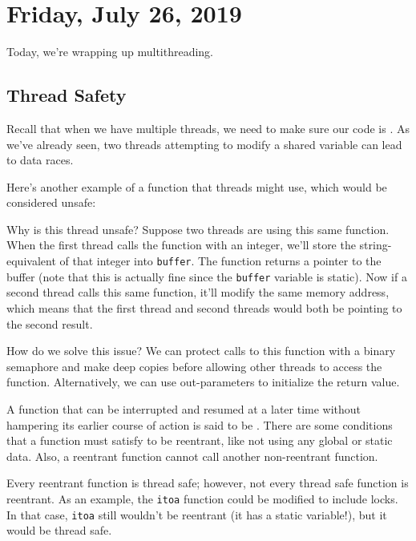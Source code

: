 \section{Friday, July 26, 2019}
Today, we're wrapping up multithreading.

\subsection{Thread Safety}
Recall that when we have multiple threads, we need to make sure our code is . As we've already seen, two threads attempting to modify a shared variable can lead to data races. 

Here's another example of a function that threads might use, which would be considered unsafe:

\lstset{
caption=Thread Unsafe Function
}
\begin{center}

\end{center}

Why is this thread unsafe? Suppose two threads are using this same function. When the first thread calls the function with an integer, we'll store the string-equivalent of that integer into \verb!buffer!. The function returns a pointer to the buffer (note that this is actually fine since the \verb!buffer! variable is static). Now if a second thread calls this same function, it'll modify the same memory address, which means that the first thread and second threads would both be pointing to the second result. 

How do we solve this issue? We can protect calls to this function with a binary semaphore and make deep copies before allowing other threads to access the function. Alternatively, we can use out-parameters to initialize the return value. 


A function that can be interrupted and resumed at a later time without hampering its earlier course of action is said to be . There are some conditions that a function must satisfy to be reentrant, like not using any global or static data. Also, a reentrant function cannot call another non-reentrant function.


Every reentrant function is thread safe; however, not every thread safe function is reentrant. As an example, the \verb!itoa! function could be modified to include locks. In that case, \verb!itoa! still wouldn't be reentrant (it has a static variable!), but it would be thread safe. 

